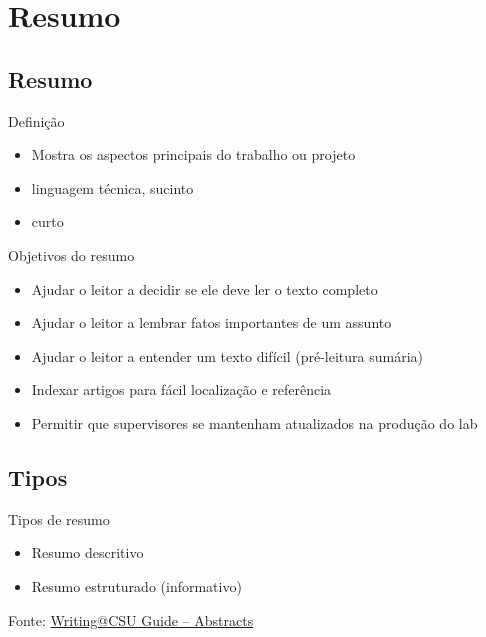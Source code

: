 \documentclass{beamer}
\begin{document}
\section{Resumo}

\subsection{Resumo}

\begin{frame}{Definição}
  \begin{itemize}
  \item Mostra os aspectos principais do trabalho ou projeto
  \item linguagem técnica, sucinto
  \item curto
  \end{itemize}
\end{frame}

\begin{frame}{Objetivos do resumo}
  \begin{itemize}
  \item Ajudar o leitor a decidir se ele deve ler o texto completo


  \item Ajudar o leitor a lembrar fatos importantes de um assunto


  \item Ajudar o leitor a entender um texto difícil (pré-leitura
    sumária)

  \item Indexar artigos para fácil localização e referência

  \item Permitir que supervisores se mantenham atualizados na produção
    do lab
  \end{itemize}
\end{frame}

\subsection{Tipos}

\begin{frame}{Tipos de resumo}
  \begin{itemize}
  \item Resumo descritivo
  \item Resumo estruturado (informativo)
  \end{itemize}

  \vfill
  \scriptsize
  \hfill Fonte: \href{https://writing.colostate.edu/guides/guide.cfm?guideid=59}{Writing@CSU Guide -- Abstracts}
\end{frame}
\end{document}
